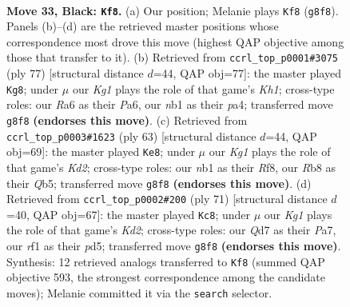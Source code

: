 \documentclass[11pt]{article}
\begin{document}
\clearpage

\begin{figure}[p]\centering
\begin{subfigure}{0.46\textwidth}\centering
\resizebox{\linewidth}{!}{%
\newchessgame
\chessboard[
  setfen={1r4k1/2pq1p2/r7/2p1p1Q1/2P1P1P1/3P4/7K/1N3R2 b - - 0 33},
  showmover=false,
  pgfstyle=straightmove, color=movearrow, markmove={g8-f8}
]}
\caption{}
\end{subfigure}\hfill
\begin{subfigure}{0.46\textwidth}\centering
\resizebox{\linewidth}{!}{%
\newchessgame
\chessboard[
  setfen={2r4k/6p1/p2p4/3P1RpQ/P5P1/2q4P/5p1K/8 b - - 3 39},
  showmover=false,
  pgfstyle=straightmove, color=movearrow, markmove={h8-g8}
]}
\caption{}
\end{subfigure}
\\[4pt]
\begin{subfigure}{0.46\textwidth}\centering
\resizebox{\linewidth}{!}{%
\newchessgame
\chessboard[
  setfen={5r2/Q2k1p2/4p3/1q1pP2r/pP3P2/R1P5/4N3/4K3 b - - 1 32},
  showmover=false,
  pgfstyle=straightmove, color=movearrow, markmove={d7-e8}
]}
\caption{}
\end{subfigure}\hfill
\begin{subfigure}{0.46\textwidth}\centering
\resizebox{\linewidth}{!}{%
\newchessgame
\chessboard[
  setfen={8/pp1k2Q1/3p4/3P4/1P2P3/5Pp1/P1r3Nq/1R3K2 b - - 6 36},
  showmover=false,
  pgfstyle=straightmove, color=movearrow, markmove={d7-c8}
]}
\caption{}
\end{subfigure}
\caption{\textbf{Move 33, Black: \texttt{Kf8}.} (a) Our position; Melanie plays \texttt{Kf8} (\texttt{g8f8}). Panels (b)--(d) are the retrieved master positions whose correspondence most drove this move (highest QAP objective among those that transfer to it). (b) Retrieved from \texttt{ccrl\_top\_p0001\#3075} (ply 77) [structural distance $d$=44, QAP obj=77]: the master played \texttt{Kg8}; under $\mu$ our \emph{Kg1} plays the role of that game's \emph{Kh1}; cross-type roles: our \emph{R}a6 as their \emph{P}a6, our \emph{n}b1 as their \emph{p}a4; transferred move \texttt{g8f8} \textbf{(endorses this move)}. (c) Retrieved from \texttt{ccrl\_top\_p0003\#1623} (ply 63) [structural distance $d$=44, QAP obj=69]: the master played \texttt{Ke8}; under $\mu$ our \emph{Kg1} plays the role of that game's \emph{Kd2}; cross-type roles: our \emph{n}b1 as their \emph{R}f8, our \emph{R}b8 as their \emph{Q}b5; transferred move \texttt{g8f8} \textbf{(endorses this move)}. (d) Retrieved from \texttt{ccrl\_top\_p0002\#200} (ply 71) [structural distance $d$=40, QAP obj=67]: the master played \texttt{Kc8}; under $\mu$ our \emph{Kg1} plays the role of that game's \emph{Kd2}; cross-type roles: our \emph{Q}d7 as their \emph{P}a7, our \emph{r}f1 as their \emph{p}d5; transferred move \texttt{g8f8} \textbf{(endorses this move)}. Synthesis: 12 retrieved analogs transferred to \texttt{Kf8} (summed QAP objective 593, the strongest correspondence among the candidate moves); Melanie committed it via the \texttt{search} selector.}
\label{fig:thought-m65}
\end{figure}
\end{document}
